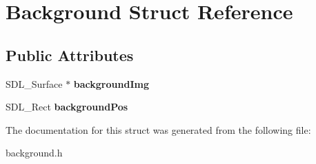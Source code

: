 \hypertarget{structBackground}{}\section{Background Struct Reference}
\label{structBackground}
\subsection*{Public Attributes}
\begin{DoxyCompactItemize}
\item 
S\+D\+L\+\_\+\+Surface $\ast$ {\bfseries background\+Img}\hypertarget{structBackground_ade7f4649cb1e02ab75167ce898db884c}{}\label{structBackground_ade7f4649cb1e02ab75167ce898db884c}

\item 
S\+D\+L\+\_\+\+Rect {\bfseries background\+Pos}\hypertarget{structBackground_a81fdaea521be13c6634186f72b105e33}{}\label{structBackground_a81fdaea521be13c6634186f72b105e33}

\end{DoxyCompactItemize}


The documentation for this struct was generated from the following file\+:\begin{DoxyCompactItemize}
\item 
background.\+h\end{DoxyCompactItemize}
